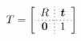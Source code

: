 \begin{equation}
  \label{mat:transformation_matrix}
  \centering
  T=\left[
    \begin{array}{c;{1pt/2pt}c}
      R & \vb*{t} \\ \hdashline[1pt/2pt]
      \vb*{0}& 1
    \end{array}
\right]
\end{equation}
